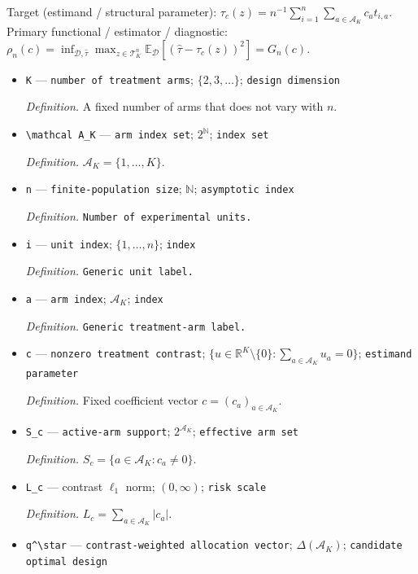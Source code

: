 \documentclass{article}
\begin{document}
Target (estimand / structural parameter): \(\tau_c(z)=n^{-1}\sum_{i=1}^n\sum_{a\in\mathcal A_K}c_at_{i,a}\).
Primary functional / estimator / diagnostic: \(\rho_n(c)=\inf_{\mathcal D,\widehat\tau}\max_{z\in\mathcal T_K^n}\mathbb E_{\mathcal D}[(\widehat\tau-\tau_c(z))^2]=G_n(c)\).
\begin{itemize}
  \item \texttt{K} --- \texttt{number of treatment arms}; \(\{2,3,\ldots\}\); \texttt{design dimension}
  \par\smallskip\noindent\emph{Definition.} A fixed number of arms that does not vary with \(n\).
  \item \texttt{\textbackslash{}\allowbreak{}mathcal A\_\allowbreak{}K} --- \texttt{arm index set}; \(2^{\mathbb N}\); \texttt{index set}
  \par\smallskip\noindent\emph{Definition.} \(\mathcal A_K=\{1,\ldots,K\}\).
  \item \texttt{n} --- \texttt{finite-\allowbreak{}population size}; \(\mathbb N\); \texttt{asymptotic index}
  \par\smallskip\noindent\emph{Definition.} \texttt{Number of experimental units.}
  \item \texttt{i} --- \texttt{unit index}; \(\{1,\ldots,n\}\); \texttt{index}
  \par\smallskip\noindent\emph{Definition.} \texttt{Generic unit label.}
  \item \texttt{a} --- \texttt{arm index}; \(\mathcal A_K\); \texttt{index}
  \par\smallskip\noindent\emph{Definition.} \texttt{Generic treatment-\allowbreak{}arm label.}
  \item \texttt{c} --- \texttt{nonzero treatment contrast}; \(\{u\in\mathbb R^K\setminus\{0\}:\sum_{a\in\mathcal A_K}u_a=0\}\); \texttt{estimand parameter}
  \par\smallskip\noindent\emph{Definition.} Fixed coefficient vector \(c=(c_a)_{a\in\mathcal A_K}\).
  \item \texttt{S\_\allowbreak{}c} --- \texttt{active-\allowbreak{}arm support}; \(2^{\mathcal A_K}\); \texttt{effective arm set}
  \par\smallskip\noindent\emph{Definition.} \(S_c=\{a\in\mathcal A_K:c_a\ne0\}\).
  \item \texttt{L\_\allowbreak{}c} --- contrast \(\ell_1\) norm; \((0,\infty)\); \texttt{risk scale}
  \par\smallskip\noindent\emph{Definition.} \(L_c=\sum_{a\in\mathcal A_K}|c_a|\).
  \item \texttt{q\textasciicircum{}\textbackslash{}\allowbreak{}star} --- \texttt{contrast-\allowbreak{}weighted allocation vector}; \(\Delta(\mathcal A_K)\); \texttt{candidate optimal design}

\end{itemize}
\end{document}

